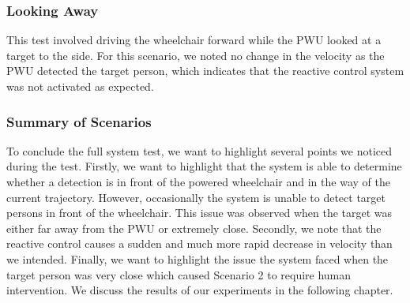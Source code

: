 \subsubsection{Looking Away}
This test involved driving the wheelchair forward while the PWU looked at a target to the side. For this scenario, we noted no change in the velocity as the PWU detected the target person, which indicates that the reactive control system was not activated as expected.

\subsubsection{Summary of Scenarios}
To conclude the full system test, we want to highlight several points we noticed during the test. Firstly, we want to highlight that the system is able to determine whether a detection is in front of the powered wheelchair and in the way of the current trajectory. However, occasionally the system is unable to detect target persons in front of the wheelchair. This issue was observed when the target was either far away from the PWU or extremely close. Secondly, we note that the reactive control causes a sudden and much more rapid decrease in velocity than we intended. Finally, we want to highlight the issue the system faced when the target person was very close which caused Scenario 2 to require human intervention. We discuss the results of our experiments in the following chapter.
